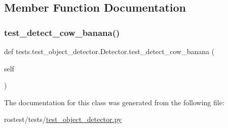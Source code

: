 \subsection{Member Function Documentation}
\mbox{\label{classtests_1_1test__object__detector_1_1Detector_afa15ba2941421016d69736377f867233}} 
\subsubsection{\texorpdfstring{test\+\_\+detect\+\_\+cow\+\_\+banana()}{test\_detect\_cow\_banana()}}
{\footnotesize\ttfamily def tests.\+test\+\_\+object\+\_\+detector.\+Detector.\+test\+\_\+detect\+\_\+cow\+\_\+banana (\begin{DoxyParamCaption}\item[{}]{self }\end{DoxyParamCaption})}



The documentation for this class was generated from the following file\+:\begin{DoxyCompactItemize}
\item 
rostest/tests/\hyperlink{test__object__detector_8py}{test\+\_\+object\+\_\+detector.\+py}\end{DoxyCompactItemize}
